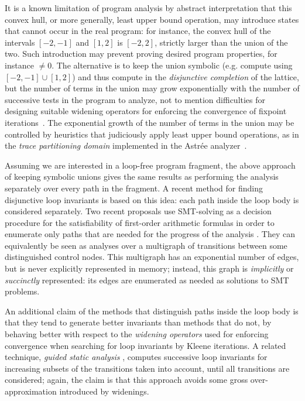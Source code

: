 \documentclass{llncs}
\begin{document}
It is a known limitation of program analysis by abstract interpretation that this convex hull, or more generally, least upper bound operation, may introduce states that cannot occur in the real program: for instance, the convex hull of the intervals $[-2,-1]$ and $[1,2]$ is $[-2,2]$, strictly larger than the union of the two.
Such introduction may prevent proving desired program properties, for instance $\neq 0$. The alternative is to keep the union symbolic (e.g. compute using $[-2,-1] \cup [1,2]$) and thus compute in the \emph{disjunctive completion}
of the lattice, but the number of terms in the union may grow exponentially with the number of successive tests in the program to analyze, not to mention difficulties for designing suitable widening operators for enforcing the convergence of fixpoint iterations~\cite{PPL,BagnaraHZ08SCP,DBLP:journals/sttt/BagnaraHZ07}.
The exponential growth of the number of terms in the union may be controlled by heuristics that judiciously apply least upper bound operations, as in the \emph{trace partitioning domain} \cite{Rival_Mauborgne_TOPLAS07} implemented in the Astr\'ee analyzer~\cite{ASTREE_PLDI03,ASTREE_ESOP05}.

Assuming we are  interested in a loop-free program fragment, the above approach of keeping symbolic unions gives the same results as performing the analysis separately over every path in the fragment.
A recent method for finding disjunctive loop invariants \cite{DBLP:conf/pldi/GulwaniZ10} is based on this idea: each path inside the loop body is considered separately.
Two recent proposals use SMT-solving \cite{Kroening_Strichman_08} as a decision procedure for the satisfiability of first-order arithmetic formulas in order to enumerate only paths that are needed for the progress of the analysis \cite{Gawlitza_Monniaux_ESOP11,Monniaux_Gonnord_SAS11}. They can equivalently be seen as analyses over a multigraph of transitions between some distinguished control nodes. This multigraph has an exponential number of edges, but is never explicitly represented in memory; instead, this graph is \emph{implicitly} or \emph{succinctly} represented: its edges are enumerated as needed as solutions to SMT problems.

An additional claim of the methods that distinguish paths inside the loop body \cite{DBLP:conf/pldi/GulwaniZ10,Monniaux_Gonnord_SAS11} is that they tend to generate better invariants than methods that do not, by behaving better with respect to the \emph{widening operators} \cite{CousotCousot_JLC92}
used for enforcing convergence when searching for loop invariants by Kleene iterations. A related technique, \emph{guided static analysis} \cite{DBLP:conf/sas/GopanR07}, computes successive loop invariants for increasing subsets of the transitions taken into account, until all transitions are considered; again, the claim is that this approach avoids some gross over-approximation introduced by widenings.
\end{document}
